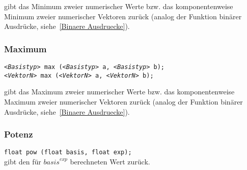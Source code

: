  gibt das Minimum zweier numerischer Werte bzw. das komponentenweise
Minimum zweier numerischer Vektoren zurück (analog der Funktion binärer Ausdrücke,
siehe~\ref{Binaere Ausdruecke}).

\subsubsection{Maximum}

\texttt{\emph{<Basistyp>} max (\emph{<Basistyp>} a, \emph{<Basistyp>} b);}\\
\texttt{\emph{<VektorN>} max (\emph{<VektorN>} a, \emph{<VektorN>} b);}

 gibt das Maximum zweier numerischer Werte bzw. das komponentenweise
Maximum zweier numerischer Vektoren zurück (analog der Funktion binärer Ausdrücke,
siehe~\ref{Binaere Ausdruecke}).

\subsubsection{Potenz}

\texttt{float pow (float basis, float exp);}\\

 gibt den für $\mathit{basis}^\mathit{exp}$ berechneten Wert zurück.
